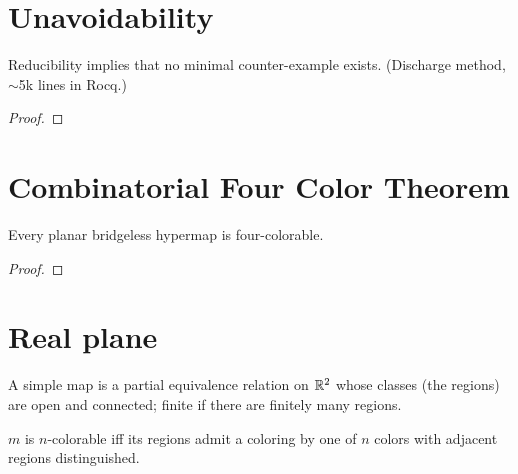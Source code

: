 \chapter{Unavoidability}


\begin{theorem}[Unavoidability]
  \label{thm:unavoidability}
  \leanok
  Reducibility implies that no minimal counter-example exists. (Discharge
  method, $\sim$5k lines in Rocq.)
\end{theorem}
\begin{proof}\notready\end{proof}

\chapter{Combinatorial Four Color Theorem}


\begin{theorem}[Combinatorial 4CT]
  \label{thm:four-color-hypermap}
  \leanok
  Every planar bridgeless hypermap is four-colorable.
\end{theorem}
\begin{proof}\leanok\end{proof}

\chapter{Real plane}


\begin{definition}
  \label{def:SimpleMap}
  \leanok
  A simple map is a partial equivalence relation on $\mathbb{R}^2$ whose classes
  (the regions) are open and connected; finite if there are finitely many
  regions.
\end{definition}

\begin{definition}[$n$-colorable]
  \label{def:ColorableWith}
  \leanok
  $m$ is $n$-colorable iff its regions admit a coloring by one of $n$
  colors with adjacent regions distinguished.
\end{definition}

